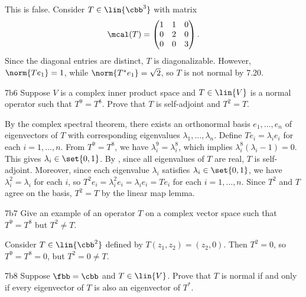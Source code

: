 \begin{sol}
    This is false.
    Consider $T \in \lin{\cbb^3}$ with matrix
    \[
        \mcal(T) = 
        \begin{pmatrix}
            1 & 1 & 0 \\
            0 & 2 & 0 \\
            0 & 0 & 3
        \end{pmatrix}.
    \]
    Since the diagonal entries are distinct, $T$ is diagonalizable.
    However, $\norm{T e_1} = 1$, while $\norm{T^\ast e_1} = \sqrt 2$, so $T$ is not normal by 7.20.
\end{sol}

\begin{exercise}{7b6}
    Suppose $V$ is a complex inner product space and $T \in \lin{V}$ is a normal operator such that $T^9 = T^8$.
    Prove that $T$ is self-adjoint and $T^2 = T$.
\end{exercise}

\begin{sol}
    By the complex spectral theorem, there exists an orthonormal basis $e_1, \ldots, e_n$ of eigenvectors of $T$ with corresponding eigenvalues $\lambda_1, \ldots, \lambda_n$.
    Define $T e_i = \lambda_i e_i$ for each $i = 1, \ldots, n$.
    From $T^9 = T^8$, we have $\lambda_i^9 = \lambda_i^8$, which implies $\lambda_i^8(\lambda_i - 1) = 0$.
    This gives $\lambda_i \in \set{0, 1}$.
    By , since all eigenvalues of $T$ are real, $T$ is self-adjoint.
    Moreover, since each eigenvalue $\lambda_i$ satisfies $\lambda_i \in \set{0, 1}$, we have $\lambda_i^2 = \lambda_i$ for each $i$, so $T^2 e_i = \lambda_i^2 e_i = \lambda_i e_i = T e_i$ for each $i = 1, \ldots, n$.
    Since $T^2$ and $T$ agree on the basis, $T^2 = T$ by the linear map lemma.
\end{sol}

\begin{exercise}{7b7}
    Give an example of an operator $T$ on a complex vector space such that $T^9 = T^8$ but $T^2 \neq T$.
\end{exercise}

\begin{sol}
    Consider $T \in \lin{\cbb^2}$ defined by $T(z_1, z_2) = (z_2, 0)$.
    Then $T^2 = 0$, so $T^9 = T^8 = 0$, but $T^2 = 0 \neq T$.
\end{sol}

\begin{exercise}{7b8}
    Suppose $\fbb = \cbb$ and $T \in \lin{V}$.
    Prove that $T$ is normal if and only if every eigenvector of $T$ is also an eigenvector of $T^\ast$.
\end{exercise}

